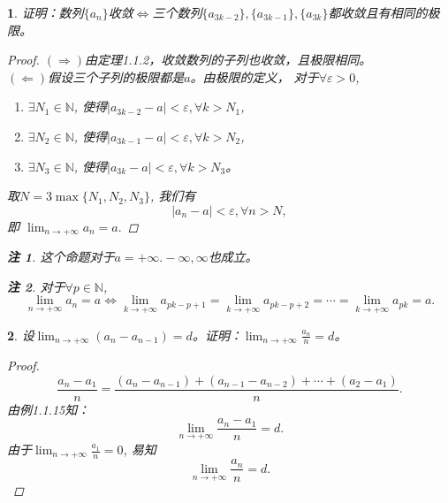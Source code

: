 \documentclass[utf8]{book}
\newtheorem{example}{}[section]             %
\newtheorem{remark}{注}
\begin{document}
\begin{example}
证明：数列$\{a_n\}$收敛$\Leftrightarrow$三个数列$\{a_{3k-2}\}, \{a_{3k-1}\}, \{a_{3k}\}$都收敛且有相同的极限。
\begin{proof}
$(\Rightarrow)$由定理1.1.2，收敛数列的子列也收敛，且极限相同。\\
$(\Leftarrow)$假设三个子列的极限都是$a$。由极限的定义， 对于$\forall \varepsilon > 0$, 
\begin{enumerate}
\renewcommand\labelenumi{\normalfont(\theenumi)}
\item $\exists N_{1} \in \mathbb{N}$, 使得$\left |a_{3k-2} - a\right | < \varepsilon, \forall k > N_{1}$,
\item $\exists N_{2} \in \mathbb{N}$, 使得$\left |a_{3k-1} - a\right | < \varepsilon, \forall k > N_{2}$,
\item $\exists N_{3} \in \mathbb{N}$, 使得$\left |a_{3k} - a\right | < \varepsilon, \forall k > N_{3}$。
\end{enumerate}
取$N = 3\max\{N_1,N_2,N_3\}$, 我们有$$\left | a_n - a \right | < \varepsilon, \forall n > N,$$
即 $\displaystyle \lim_{n\to +\infty}a_n = a.$
\end{proof}
\begin{remark}
这个命题对于$a = +\infty. -\infty, \infty$也成立。
\end{remark}
\begin{remark}
对于$\forall p \in \mathbb{N}$, $$\displaystyle \lim_{n\to +\infty}a_n = a \Leftrightarrow \lim_{k\to +\infty}a_{pk-p+1} = \lim_{k\to +\infty}a_{pk-p+2} 
=\cdots = \lim_{k\to +\infty}a_{pk} = a.$$

\end{remark}

\end{example}
\begin{example}
设$\displaystyle \lim_{n\to +\infty}(a_n - a_{n-1}) = d$。证明：$\displaystyle \lim_{n\to +\infty}\frac{a_n}{n} = d$。
\begin{proof}
$$\frac{a_n - a_1}{n} = \frac{(a_n - a_{n-1}) + (a_{n-1} - a_{n-2}) + \cdots + (a_2 - a_1)}{n}.$$
由例1.1.15知：
$$\displaystyle \lim_{n\to +\infty}\frac{a_n - a_1}{n} = d.$$
由于$\displaystyle \lim_{n\to +\infty}\frac{a_1}{n} = 0$, 易知
$$\displaystyle \lim_{n\to +\infty}\frac{a_n}{n} = d.$$
\end{proof}
\end{example}
\end{document}
